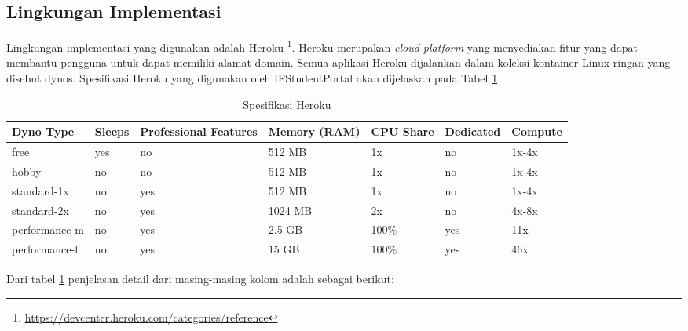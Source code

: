\subsection{Lingkungan Implementasi}
		\label{sec:lingkungan_implementasi}
			Lingkungan implementasi yang digunakan adalah Heroku \footnote{\url{https://devcenter.heroku.com/categories/reference}}. Heroku merupakan \textit{cloud platform} yang menyediakan fitur yang dapat membantu pengguna untuk dapat memiliki alamat domain. Semua aplikasi Heroku dijalankan dalam koleksi kontainer Linux ringan yang disebut dynos. Spesifikasi Heroku yang digunakan oleh IFStudentPortal akan dijelaskan pada Tabel \ref{tab:dynotype}
\begin{table}[H]
	\centering
		\caption{Spesifikasi Heroku}
			\begin{tabular}{ |p{2.65cm}|p{1.5cm}|p{2cm}|p{1.5cm}|p{1.5cm}|p{1.5cm}|p{1.5cm}|}
			\hline
			Dyno Type & Sleeps & Professional Features & Memory (RAM) & CPU Share & Dedicated & Compute \\ \hline
			free & yes & no & 512 MB & 1x & no & 1x-4x \\ \hline
			hobby & no & no & 512 MB & 1x & no & 1x-4x \\ \hline
			standard-1x & no & yes & 512 MB & 1x & no & 1x-4x \\ \hline
			standard-2x & no & yes & 1024 MB & 2x & no & 4x-8x \\ \hline
			performance-m & no & yes & 2.5 GB & 100\% & yes & 11x \\ \hline
			performance-l & no & yes & 15 GB & 100\% & yes & 46x \\ \hline
			\end{tabular}
		\label{tab:dynotype}
\end{table}
			Dari tabel \ref{tab:dynotype} penjelasan detail dari masing-masing kolom adalah sebagai berikut:

